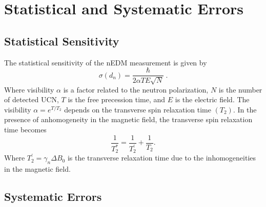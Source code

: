 \section{Statistical and Systematic Errors}
\subsection{Statistical Sensitivity}
The statistical sensitivity of the nEDM measurement is given by
\begin{equation}
  \label{eqn:dnsensitivity}
  \sigma(d_n) = \frac{\hbar}{2 \alpha T E \sqrt{N}}~.
\end{equation}
Where visibility $\alpha$ is a factor related to the neutron
polarization, $N$ is the number of detected UCN, $T$ is the free
precession time, and $E$ is the electric field. The visibility
$\alpha = e^{T/T_2}$ depends on the transverse spin relaxation time
$(T_2)$.  In the presence of anhomogeneity in the magnetic field, the
transverse spin relaxation time becomes
\begin{equation}
  \frac{1}{T_2^*} = \frac{1}{T_2^{\prime}} + \frac{1}{T_2}.
\end{equation}
Where $T_2^{\prime} = \gamma_n \Delta B_0$ is the transverse
relaxation time due to the inhomogeneities in the magnetic field.


\subsection{Systematic Errors~\label{sec:systematics}}

